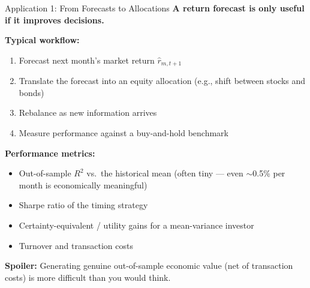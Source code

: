\documentclass[10pt]{beamer}
\begin{document}
\begin{frame}{Application 1: From Forecasts to Allocations}
  \textbf{A return forecast is only useful if it improves decisions.}

  \vspace{1em}
  \textbf{Typical workflow:}
  \begin{enumerate}
    \item Forecast next month's market return $\widehat{r}_{m,t+1}$
    \item Translate the forecast into an equity allocation (e.g., shift between stocks and bonds)
    \item Rebalance as new information arrives
    \item Measure performance against a buy-and-hold benchmark
  \end{enumerate}

  \vspace{0.5em}
  \textbf{Performance metrics:}
  \begin{itemize}
    \item Out-of-sample $R^2$ vs.\ the historical mean (often tiny --- even $\sim$0.5\% per month is economically meaningful)
    \item Sharpe ratio of the timing strategy
    \item Certainty-equivalent / utility gains for a mean-variance investor
    \item Turnover and transaction costs
  \end{itemize}

  \vspace{0.5em}
  \textbf{Spoiler:} Generating genuine out-of-sample economic value (net of transaction costs) is more difficult than you would think.
\end{frame}
\end{document}
